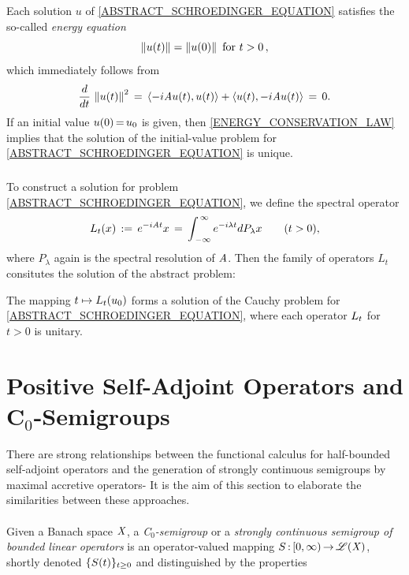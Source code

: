 \documentclass[11pt,twoside]{article}
\begin{document}
\subparagraph*{}
Each solution $u$ of \eqref{ABSTRACT_SCHROEDINGER_EQUATION}
satisfies the so-called \textit{energy equation}
\begin{equation}\label{ENERGY_CONSERVATION_LAW}
\left\lVert u(t) \right\rVert = \left\lVert u(0) \right\rVert \mbox{ for } t > 0\,,
\end{equation}
which immediately follows from
\[
\frac{d}{dt} \, \left\lVert u(t) \right\rVert^2
\,=\,
\langle -i\mathit{A} u(t),u(t) \rangle + \langle u(t),-i \mathit{A} u(t) \rangle \,=\, 0.
\]
If an initial value $u(0) {\,=\,} u_0$ is given,
then \eqref{ENERGY_CONSERVATION_LAW} implies
that the solution of the initial-value problem 
for \eqref{ABSTRACT_SCHROEDINGER_EQUATION} is unique.

\subparagraph*{}
To construct a solution for problem \eqref{ABSTRACT_SCHROEDINGER_EQUATION},
we define the spectral operator
\begin{equation}\label{SPECTRAL_OPERATOR_III}
L_t(x) 
\,:=\,
e^{-i \mathit{A} t} x
\,=\,
\int_{\,-\infty}^{\,\infty} e^{-i \lambda t} dP_{\lambda} x
\quad \quad (t > 0),
\end{equation}
where $P_{\lambda}$ again is the spectral resolution of $\mathit{A}$.
Then the family of operators $L_t$ consitutes the solution
of the abstract {\SCHROEDINGER} problem:

\begin{theorem}\label{EXISTENCE_THEOREM_FOR_ABSTRACT_SCHROEDINGER_EQUATION}
The mapping $t \mapsto {L}_t(u_0)$ forms a solution
of the Cauchy problem for \eqref{ABSTRACT_SCHROEDINGER_EQUATION},
where each operator ${L}_t$ for $t > 0$ is unitary.
\end{theorem}

%

\section{Positive Self-Adjoint Operators and C$_0$-Semigroups}
There are strong relationships between the functional calculus
for half-bounded self-adjoint operators
and the generation of strongly continuous semigroups
by maximal accretive operators-
It is the aim of this section to elaborate the similarities
between these approaches.

\paragraph*{}
Given a Banach space $\mathit{X}$,
a \textit{C$_0$-semigroup} or
a \textit{strongly continuous semigroup of bounded linear operators}
is an operator-valued mapping ${S} {\,:\,} [0,\infty) {\,\to\,} \mathscr{L}(\mathit{X})$,
shortly denoted $\{{S}(t)\}_{t \geq 0}$
and distinguished by the properties
\end{document}
